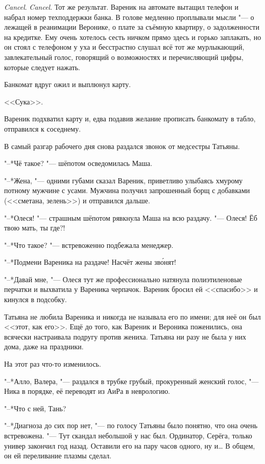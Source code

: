 \textit{Cancel}.
\textit{Cancel}.
Тот же результат.
Вареник на автомате вытащил телефон и набрал номер техподдержки банка.
В голове медленно проплывали мысли "--- о лежащей в реанимации Веронике, о плате за съёмную квартиру, о задолженности на кредитке.
Ему очень хотелось сесть ничком прямо здесь и горько заплакать, но он стоял с телефоном у уха и бесстрастно слушал всё тот же мурлыкающий, завлекательный голос, говорящий о возможностях и перечисляющий цифры, которые следует нажать.

Банкомат вдруг ожил и выплюнул карту.

<<Сука>>.

Вареник подхватил карту и, едва подавив желание прописать банкомату в табло, отправился к соседнему.

\asterism

\textspace

\label{Thu_2012_06_14}

В самый разгар рабочего дня снова раздался звонок от медсестры Татьяны.

"--*Чё такое? "--- шёпотом осведомилась Маша.

"--*Жена, "--- одними губами сказал Вареник, приветливо улыбаясь хмурому потному мужчине с усами.
Мужчина получил запрошенный борщ с добавками (<<сметана, зелень>>) и отправился дальше.

"--*Олеся! "--- страшным шёпотом рявкнула Маша на всю раздачу.
"--- Олеся!
Ёб твою мать, ты где?!

"--*Что такое? "--- встревоженно подбежала менеджер.

"--*Подмени Вареника на раздаче!
Насчёт жены зв\'онят!

"--*Давай мне, "--- Олеся тут же профессионально натянула полиэтиленовые перчатки и выхватила у Вареника черпачок.
Вареник бросил ей <<спасибо>> и кинулся в подсобку.

Татьяна не любила Вареника и никогда не называла его по имени;
для неё он был <<этот, как его>>.
Ещё до того, как Вареник и Вероника поженились, она всячески настраивала подругу против жениха.
Татьяна ни разу не была у них дома, даже на праздники.

На этот раз что-то изменилось.

"--*Алло, Валера, "--- раздался в трубке грубый, прокуренный женский голос, "--- Ника в порядке, её переводят из АиРа в неврологию.

"--*Что с ней, Тань?

"--*Диагноза до сих пор нет, "--- по голосу Татьяны было понятно, что она очень встревожена.
"--- Тут скандал небольшой у нас был.
Ординатор, Серёга, только универ закончил год назад.
Оставили его на пару часов одного, ну и\ldots{}
В общем, он ей переливание плазмы сделал.

